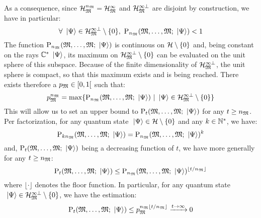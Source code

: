  As a consequence, since $\mathcal H_{\mathfrak{M}}^{n_{\mathfrak{M}}} = \mathcal H_{\mathfrak{M}}^\infty$ and $\mathcal H_{\mathfrak{M}}^{\infty \perp}$ are disjoint  by construction, we have in particular:
\begin{equation*}
\forall \ \left|{\Psi}\right\rangle \in \mathcal H_{\mathfrak{M}}^{\infty \perp} \setminus \{ 0 \},\ \mathrm P_{n_{\mathfrak{M}}}(\mathfrak{M}, \dotsc, \mathfrak{M}; \ \left|{\Psi}\right\rangle) < 1
\end{equation*}
The function $\mathrm P_{n_{\mathfrak{M}}}(\mathfrak{M}, \dotsc, \mathfrak{M}; \ \left|{\Psi}\right\rangle)$ is continuous on $\mathcal H \setminus \{ 0 \}$ and, being constant on the rays $\mathbb{C}^* \ \left|{\Psi}\right\rangle$, its maximum on $\mathcal H_{\mathfrak{M}}^{\infty \perp} \setminus \{ 0 \}$ can be evaluated on the unit sphere of this subspace. Because of the finite dimensionality of $\mathcal H_{\mathfrak{M}}^{\infty \perp}$, the unit sphere is compact, so that this maximum exists and is being reached. There exists therefore a $p_{\mathfrak{M}} \in [0, 1[$ such that:
\begin{equation*}
p_{\mathfrak{M}}^{n_{\mathfrak{M}}} = \max \{ \mathrm P_{n_{\mathfrak{M}}}(\mathfrak{M}, \dotsc, \mathfrak{M}; \ \left|{\Psi}\right\rangle)\ | \ \left|{\Psi}\right\rangle \in \mathcal H_{\mathfrak{M}}^{\infty \perp} \setminus \{ 0 \} \}
\end{equation*}
This will allow us to set an upper bound to $\mathrm P_t(\mathfrak{M}, \dotsc, \mathfrak{M}; \ \left|{\Psi}\right\rangle)$ for any $t \geq n_{\mathfrak{M}}$. Per factorization, for any quantum state $\ \left|{\Psi}\right\rangle \in \mathcal H \setminus \{ 0 \}$ and any $k \in \mathbb{N}^*$, we have:
\begin{equation*}
\mathrm P_{k n_{\mathfrak{M}}}(\mathfrak{M}, \dotsc, \mathfrak{M}; \ \left|{\Psi}\right\rangle) = \mathrm P_{n_{\mathfrak{M}}}(\mathfrak{M}, \dotsc, \mathfrak{M}; \ \left|{\Psi}\right\rangle)^k
\end{equation*}
and, $\mathrm P_t(\mathfrak{M}, \dotsc, \mathfrak{M}; \ \left|{\Psi}\right\rangle)$ being a decreasing function of $t$, we have more generally for any $t \geq n_{\mathfrak{M}}$:
\begin{equation*}
\mathrm P_t(\mathfrak{M}, \dotsc, \mathfrak{M}; \ \left|{\Psi}\right\rangle) \leq \mathrm P_{n_{\mathfrak{M}}}(\mathfrak{M}, \dotsc, \mathfrak{M}; \ \left|{\Psi}\right\rangle)^{\lfloor t / n_{\mathfrak{M}} \rfloor}
\end{equation*}
where $\lfloor \cdot \rfloor$ denotes the floor function. In particular, for any quantum state $\ \left|{\Psi}\right\rangle \in \mathcal H_{\mathfrak{M}}^{\infty \perp} \setminus \{ 0 \}$, we have the estimation:
\begin{equation*}
\mathrm P_t(\mathfrak{M}, \dotsc, \mathfrak{M}; \ \left|{\Psi}\right\rangle) \leq p_{\mathfrak{M}}^{n_{\mathfrak{M}} \lfloor t / n_{\mathfrak{M}} \rfloor} \xrightarrow{t \to \infty} 0
\end{equation*}

